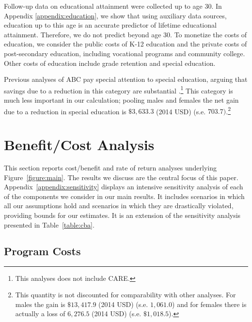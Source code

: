 Follow-up data on educational attainment were collected up to age 30. In Appendix \ref{appendix:education}, we show that using auxiliary data sources, education up to this age is an accurate predictor of lifetime educational attainment. Therefore, we do not predict beyond age 30. To monetize the costs of education, we consider the public costs of K-12 education and the private costs of post-secondary education, including vocational programs and community college. Other costs of education include grade retention and special education.

Previous analyses of ABC pay special attention to special education, arguing that savings due to a reduction in this category are substantial \citep{Barnett_Masse_2002_benefitcost,Barnett_Masse_2007_EER}.\footnote{This analyses does not include CARE.} This category is much less important in our calculation; pooling males and females the net gain due to a reduction in special education is $\$3,633.3$ (2014 USD) (s.e. $703.7)$.\footnote{This quantity is not discounted for comparability with other analyses. For males the gain is $\$13,417.9$ (2014 USD) (s.e. $1,061.0$) and for females there is actually a loss of $6,276.5$ (2014 USD) (s.e. $\$1,018.5$).}

\section{Benefit/Cost Analysis} \label{section:cbaresults}

This section reports cost/benefit and rate of return analyses underlying Figure~\ref{figure:main}. The results we discuss are the central focus of this paper. Appendix~\ref{appendix:sensitivity} displays an intensive sensitivity analysis of each of the components we consider in our main results. It includes scenarios in which all our assumptions hold and scenarios in which they are drastically violated, providing bounds for our estimates. It is an extension of the sensitivity analysis presented in Table~\ref{table:cba}.

\subsection{Program Costs} \label{section:programscosts}

